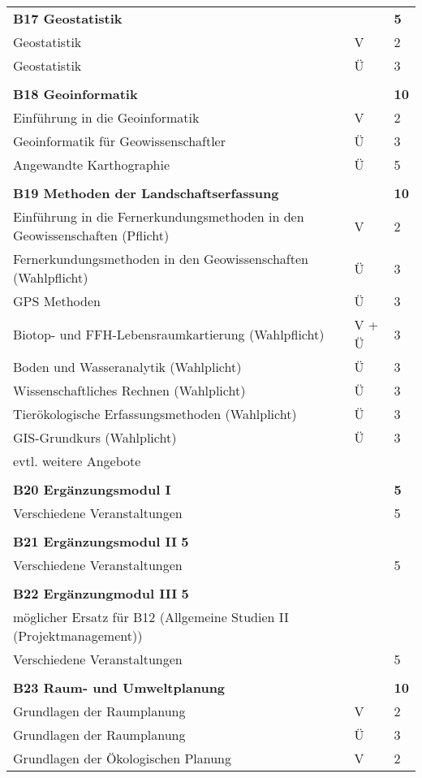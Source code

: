 \begin{longtable}{p{} p{} p{}}
\textbf{B17 Geostatistik} && \textbf{5}\\
Geostatistik & V & 2\\
Geostatistik & Ü & 3\\
&&\\
\textbf{B18 Geoinformatik} && \textbf{10}\\
Einführung in die Geoinformatik & V & 2\\
Geoinformatik für Geowissenschaftler & Ü & 3\\
Angewandte Karthographie & Ü & 5\\
&&\\
\textbf{B19 Methoden der Landschaftserfassung}&&\textbf{10}\\
Einführung in die Fernerkundungsmethoden in den Geowissenschaften (Pflicht) & V & 2\\
Fernerkundungsmethoden in den Geowissenschaften (Wahlpflicht) & Ü & 3\\
GPS Methoden & Ü & 3\\
Biotop- und FFH-Lebensraumkartierung (Wahlpflicht) & V + Ü & 3\\
Boden und Wasseranalytik (Wahlplicht) & Ü & 3\\
Wissenschaftliches Rechnen (Wahlplicht) & Ü & 3\\
Tierökologische Erfassungsmethoden (Wahlplicht) & Ü & 3\\
GIS-Grundkurs (Wahlplicht)  & Ü & 3\\
evtl. weitere Angebote\\
&&\\
\textbf{B20 Ergänzungsmodul I} && \textbf{5}\\
Verschiedene Veranstaltungen & & 5\\
&&\\
\textbf{B21 Ergänzungsmodul II} \textbf{5}\\
Verschiedene Veranstaltungen & & 5\\
&&\\
\textbf{B22 Ergänzungmodul III} \textbf{5}\\
möglicher Ersatz für B12 (Allgemeine Studien II (Projektmanagement))\\
Verschiedene Veranstaltungen & & 5\\
&&\\
\textbf{B23 Raum- und Umweltplanung}&&\textbf{10}\\
Grundlagen der Raumplanung & V & 2\\
Grundlagen der Raumplanung & Ü & 3\\
Grundlagen der Ökologischen Planung & V & 2\\

\end{longtable}
